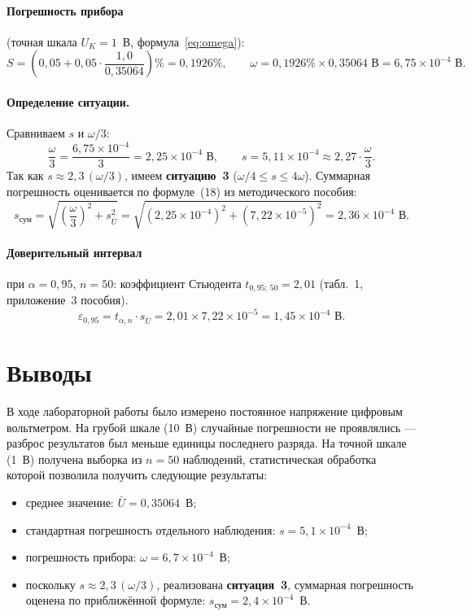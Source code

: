 \documentclass[12pt,a4paper]{article}
\begin{document}
\paragraph{Погрешность прибора} (точная шкала $U_K = 1$~В,
формула~\eqref{eq:omega}):
\[
  S = \left(0{,}05 + 0{,}05\cdot\frac{1{,}0}{0{,}35064}\right)\%
    = 0{,}1926\%,
  \qquad
  \omega = 0{,}1926\% \times 0{,}35064\text{ В}
         = 6{,}75\times10^{-4} \text{ В}.
\]

\paragraph{Определение ситуации.}
Сравниваем $s$ и $\omega/3$:
\[
  \frac{\omega}{3} = \frac{6{,}75\times10^{-4}}{3} = 2{,}25\times10^{-4} \text{ В},
  \qquad
  s = 5{,}11\times10^{-4} \approx 2{,}27 \cdot \frac{\omega}{3}.
\]
Так как $s \approx 2{,}3\,(\omega/3)$, имеем \textbf{ситуацию~3}
($\omega/4 \leq s \leq 4\omega$). Суммарная погрешность оценивается
по формуле~(18) из методического пособия:
\[
  s_{\text{сум}} = \sqrt{\left(\frac{\omega}{3}\right)^2 + s_{\bar{U}}^2}
                = \sqrt{(2{,}25\times10^{-4})^2 + (7{,}22\times10^{-5})^2}
                = 2{,}36\times10^{-4} \text{ В}.
\]

\paragraph{Доверительный интервал} при $\alpha = 0{,}95$, $n = 50$:
коэффициент Стьюдента $t_{0{,}95;\,50} = 2{,}01$ (табл.~1, приложение~3 пособия).
\[
  \varepsilon_{0{,}95}
    = t_{\alpha,n} \cdot s_{\bar{U}}
    = 2{,}01 \times 7{,}22\times10^{-5}
    = 1{,}45\times10^{-4} \text{ В}.
\]

\section{Выводы}

В ходе лабораторной работы было измерено постоянное напряжение цифровым
вольтметром. На грубой шкале (10~В) случайные погрешности не проявлялись —
разброс результатов был меньше единицы последнего разряда. На точной шкале
(1~В) получена выборка из $n = 50$ наблюдений, статистическая обработка которой
позволила получить следующие результаты:

\begin{itemize}
\item среднее значение: $\bar{U} = 0{,}35064$~В;
\item стандартная погрешность отдельного наблюдения: $s = 5{,}1\times10^{-4}$~В;
\item погрешность прибора: $\omega = 6{,}7\times10^{-4}$~В;
\item поскольку $s \approx 2{,}3\,(\omega/3)$, реализована \textbf{ситуация~3},
      суммарная погрешность оценена по приближённой формуле:
      $s_{\text{сум}} = 2{,}4\times10^{-4}$~В.
\end{itemize}
\end{document}
